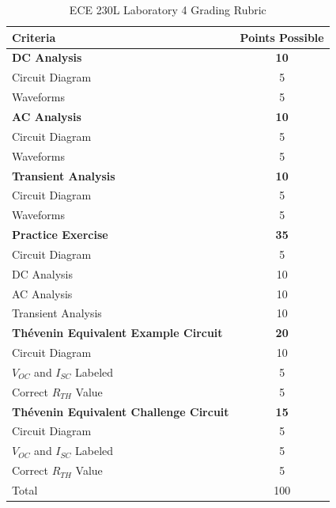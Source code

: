 \documentclass[12pt]{../manual}
\begin{document}
\begin{table}[ht!]
\caption{ECE 230L Laboratory 4 Grading Rubric}
\centering
\begin{tabular}{l|c} \hline
Criteria & Points Possible \\ \hline \hline
\textbf{DC Analysis}			& \textbf{10} \\
Circuit Diagram 				& 5 \\
Waveforms 						& 5 \\ \hline
\textbf{AC Analysis}			& \textbf{10} \\
Circuit Diagram 				& 5 \\
Waveforms 						& 5 \\ \hline
\textbf{Transient Analysis}		& \textbf{10} \\
Circuit Diagram 				& 5 \\ 
Waveforms 						& 5 \\ \hline
\textbf{Practice Exercise}		& \textbf{35} \\
Circuit Diagram 				& 5 \\
DC Analysis						& 10 \\
AC Analysis						& 10 \\
Transient Analysis				& 10 \\ \hline
\textbf{Th\'evenin Equivalent Example Circuit} & \textbf{20} \\
Circuit Diagram					& 10 \\
$V_{OC}$ and $I_{SC}$ Labeled	& 5 \\
Correct $R_{TH}$ Value			& 5 \\ \hline
\textbf{Th\'evenin Equivalent Challenge Circuit} & \textbf{15} \\
Circuit Diagram					& 5 \\
$V_{OC}$ and $I_{SC}$ Labeled	& 5 \\
Correct $R_{TH}$ Value			& 5 \\ \hline \hline
Total							& 100 \\ \hline
\end{tabular}
\end{table}
\vfill %
\end{document}
